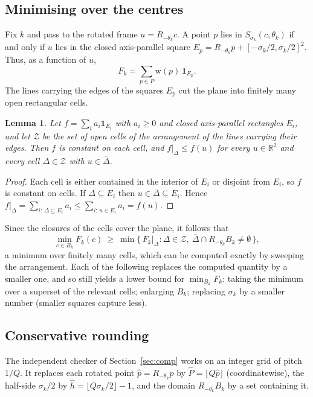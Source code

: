 \documentclass[11pt]{amsart}
\newtheorem{lemma}[theorem]{Lemma}
\theoremstyle{definition}
\theoremstyle{remark}
\newcommand{\R}{\mathbb{R}}
\newcommand{\wt}{\mathrm{w}}
\begin{document}
\subsection{Minimising over the centres}\label{sec:cells}
Fix $k$ and pass to the rotated frame $u=R_{-\theta_k}c$. A point $p$ lies in $S_{\sigma_k}(c,\theta_k)$ if and only if $u$ lies in the closed axis-parallel square $E_p=R_{-\theta_k}p+[-\sigma_k/2,\sigma_k/2]^2$. Thus, as a function of $u$,
\[
  F_k = \sum_{p\in P}\wt(p)\,\mathbf 1_{E_p}.
\]
The lines carrying the edges of the squares $E_p$ cut the plane into finitely many open rectangular cells.

\begin{lemma}\label{lem:cells}
Let $f=\sum_i a_i\mathbf 1_{E_i}$ with $a_i\ge0$ and closed axis-parallel rectangles $E_i$, and let $\mathcal Z$ be the set of open cells of the arrangement of the lines carrying their edges. Then $f$ is constant on each cell, and $f|_\Delta\le f(u)$ for every $u\in\R^2$ and every cell $\Delta\in\mathcal Z$ with $u\in\overline\Delta$.
\end{lemma}

\begin{proof}
Each cell is either contained in the interior of $E_i$ or disjoint from $E_i$, so $f$ is constant on cells. If $\Delta\subseteq E_i$ then $u\in\overline\Delta\subseteq E_i$. Hence $f|_\Delta=\sum_{i:\,\Delta\subseteq E_i}a_i\le\sum_{i:\,u\in E_i}a_i=f(u)$.
\end{proof}

Since the closures of the cells cover the plane, it follows that
\[
  \min_{c\in B_k}F_k(c)\ \ge\ \min\bigl\{\,F_k|_\Delta : \Delta\in\mathcal Z,\ \overline\Delta\cap R_{-\theta_k}B_k\ne\emptyset\,\bigr\},
\]
a minimum over finitely many cells, which can be computed exactly by sweeping the arrangement. Each of the following replaces the computed quantity by a smaller one, and so still yields a lower bound for $\min_{B_k}F_k$: taking the minimum over a superset of the relevant cells; enlarging $B_k$; replacing $\sigma_k$ by a smaller number (smaller squares capture less).

\subsection{Conservative rounding}
The independent checker of Section~\ref{sec:comp} works on an integer grid of pitch $1/Q$. It replaces each rotated point $\hat p=R_{-\theta_k}p$ by $\hat P=\lfloor Q\hat p\rfloor$ (coordinatewise), the half-side $\sigma_k/2$ by $\hat h=\lfloor Q\sigma_k/2\rfloor-1$, and the domain $R_{-\theta_k}B_k$ by a set containing it.
\end{document}
